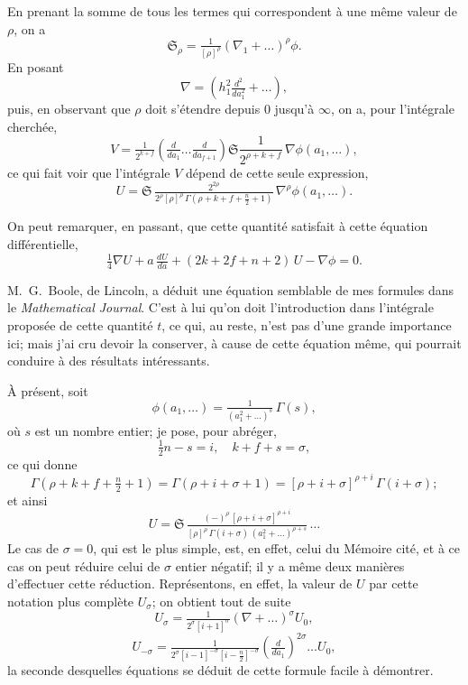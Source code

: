 \documentclass[12pt,a4paper]{article}
\providecommand{\fS}{\mathfrak{S}}
\begin{document}
En prenant la somme de tous les termes qui correspondent \`a une m\^eme valeur de $\rho$, on a
\[
\fS_\rho = \tfrac{1}{[\rho]^\rho}\left(\nabla_1 + \ldots\right)^\rho\phi.
\]
En posant
\[
\nabla = \left(h_1^2\tfrac{d^2}{da_1^2} + \ldots\right),
\]
puis, en observant que $\rho$ doit s'\'etendre depuis $0$ jusqu'\`a $\infty$, on a, pour l'int\'egrale cherch\'ee,
\[
V = \tfrac{1}{2^{k + f}}\left(\tfrac{d}{da_1}\ldots\tfrac{d}{da_{f+1}}\right)\fS\frac{1}{2^{\rho + k + f}}\,\nabla\phi(a_1, \ldots),
\]
ce qui fait voir que l'int\'egrale $V$ d\'epend de cette seule expression,
\[
U = \fS\,\tfrac{2^{2\rho}}{2^\rho[\rho]^\rho\,\Gamma(\rho + k + f + \tfrac{n}{2} + 1)}\,\nabla^\rho\phi(a_1, \ldots).
\]

\newpage
\setcounter{page}{198}

On peut remarquer, en passant, que cette quantit\'e satisfait \`a cette \'equation diff\'erentielle,
\[
\tfrac{1}{4}\nabla U + a\,\tfrac{dU}{da} + (2k + 2f + n + 2)\,U - \nabla\phi = 0.
\]

M.~G.~Boole, de Lincoln, a d\'eduit une \'equation semblable de mes formules dans le \textit{Mathematical Journal}. C'est \`a lui qu'on doit l'introduction dans l'int\'egrale propos\'ee de cette quantit\'e $t$, ce qui, au reste, n'est pas d'une grande importance ici; mais j'ai cru devoir la conserver, \`a cause de cette \'equation m\^eme, qui pourrait conduire \`a des r\'esultats int\'eressants.

\`A pr\'esent, soit
\[
\phi(a_1, \ldots) = \tfrac{1}{(a_1^2 + \ldots)^s}\,\Gamma(s),
\]
o\`u $s$ est un nombre entier; je pose, pour abr\'eger,
\[
\tfrac12 n - s = i,\quad k + f + s = \sigma,
\]
ce qui donne
\[
\Gamma(\rho + k + f + \tfrac{n}{2} + 1) = \Gamma(\rho + i + \sigma + 1) = [\rho + i + \sigma]^{\rho + i}\,\Gamma(i + \sigma);
\]
et ainsi
\[
U = \fS\,\tfrac{(-)^\rho\,[\rho + i + \sigma]^{\rho + i}}{[\rho]^\rho\,\Gamma(i + \sigma)\,(a_1^2 + \ldots)^{\rho + s}}\,\ldots
\]
Le cas de $\sigma = 0$, qui est le plus simple, est, en effet, celui du M\'emoire cit\'e, et \`a ce cas on peut r\'eduire celui de $\sigma$ entier n\'egatif; il y a m\^eme deux mani\`eres d'effectuer cette r\'eduction. Repr\'esentons, en effet, la valeur de $U$ par cette notation plus compl\`ete $U_\sigma$; on obtient tout de suite
\[
U_\sigma = \tfrac{1}{2^\sigma [i + 1]^\sigma}\left(\nabla + \ldots\right)^\sigma U_0,
\]
\[
U_{-\sigma} = \tfrac{1}{2^\sigma [i - 1]^{-\sigma}[i - \tfrac{n}{2}]^{-\sigma}}\left(\tfrac{d}{da_1}\right)^{2\sigma}\ldots U_0,
\]
la seconde desquelles \'equations se d\'eduit de cette formule facile \`a d\'emontrer.
\end{document}
